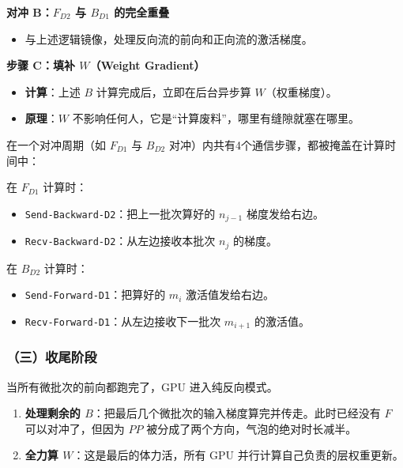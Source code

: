 \textbf{对冲 B：\(F_{D2}\) 与 \(B_{D1}\) 的完全重叠}

\begin{itemize}
\tightlist
\item
  与上述逻辑镜像，处理反向流的前向和正向流的激活梯度。
\end{itemize}

\textbf{步骤 C：填补 \(W\)（Weight Gradient）}

\begin{itemize}
\tightlist
\item
  \textbf{计算}：上述 \(B\) 计算完成后，立即在后台异步算 \(W\)（权重梯度）。
\item
  \textbf{原理}：\(W\) 不影响任何人，它是``计算废料''，哪里有缝隙就塞在哪里。
\end{itemize}

在一个对冲周期（如 \(F_{D1}\) 与 \(B_{D2}\) 对冲）内共有4个通信步骤，都被掩盖在计算时间中：

在 \(F_{D1}\) 计算时：

\begin{itemize}
\item
  \texttt{Send-Backward-D2}：把上一批次算好的 \(n_{j-1}\) 梯度发给右边。
\item
  \texttt{Recv-Backward-D2}：从左边接收本批次 \(n_j\) 的梯度。
\end{itemize}

在 \(B_{D2}\) 计算时：

\begin{itemize}
\item
  \texttt{Send-Forward-D1}：把算好的 \(m_i\) 激活值发给右边。
\item
  \texttt{Recv-Forward-D1}：从左边接收下一批次 \(m_{i+1}\) 的激活值。
\end{itemize}

\hypertarget{ux4e09ux6536ux5c3eux9636ux6bb5}{%
\subsubsection{（三）收尾阶段}\label{ux4e09ux6536ux5c3eux9636ux6bb5}}

当所有微批次的前向都跑完了，GPU 进入纯反向模式。

\begin{enumerate}
\def\labelenumi{\arabic{enumi}.}
\tightlist
\item
  \textbf{处理剩余的 \(B\)}：把最后几个微批次的输入梯度算完并传走。此时已经没有 \(F\) 可以对冲了，但因为 \(PP\) 被分成了两个方向，气泡的绝对时长减半。
\item
  \textbf{全力算 \(W\)}：这是最后的体力活，所有 GPU 并行计算自己负责的层权重更新。
\end{enumerate}

